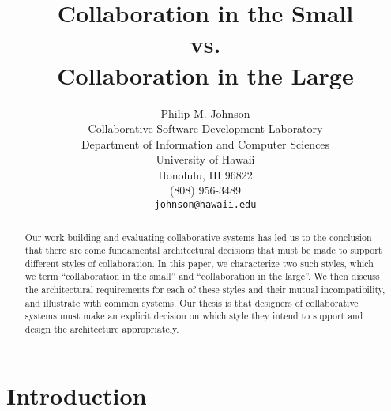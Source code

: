 




\title {Collaboration in the Small \\ vs. \\ Collaboration in the Large}
\author  {Philip M. Johnson\\
          Collaborative Software Development Laboratory\\
          Department of Information and Computer Sciences\\
          University of Hawaii\\
          Honolulu, HI 96822\\
          (808) 956-3489\\
          {\tt johnson@hawaii.edu}}

\maketitle

\begin{abstract}

  Our work building and evaluating collaborative systems has led us to
  the conclusion that there are some fundamental architectural decisions
  that must be made to support different styles of collaboration.  In
  this paper, we characterize two such styles, which we term
  ``collaboration in the small'' and ``collaboration in the large''.  We
  then discuss the architectural requirements for each of these styles
  and their mutual incompatibility, and illustrate with common systems.
  Our thesis is that designers of collaborative systems must make an
  explicit decision on which style they intend to support and design the
  architecture appropriately.

\end{abstract}

\section{Introduction}


